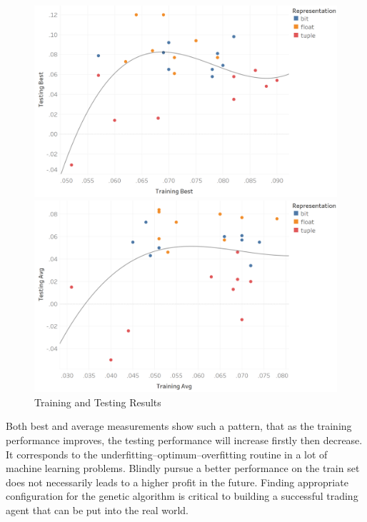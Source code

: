 \documentclass{article}
\begin{document}
\begin{figure}[H]
	\centering
		\begin{minipage}[t]{0.49\textwidth}
			\centering
			\includegraphics[width=\textwidth]{best.png}
		\end{minipage}
		\begin{minipage}[t]{0.49\textwidth}
			\centering
			\includegraphics[width=\textwidth]{avg.png}
		\end{minipage}
		\caption{Training and Testing Results}
\end{figure}

Both best and average measurements show such a pattern,
that as the training performance improves,
the testing performance will increase firstly then decrease.
It corresponds to the underfitting--optimum--overfitting routine in a lot of machine learning problems.
Blindly pursue a better performance on the train set does not necessarily leads to
a higher profit in the future.
Finding appropriate configuration for the genetic algorithm is critical to building
a successful trading agent that can be put into the real world.
\end{document}
